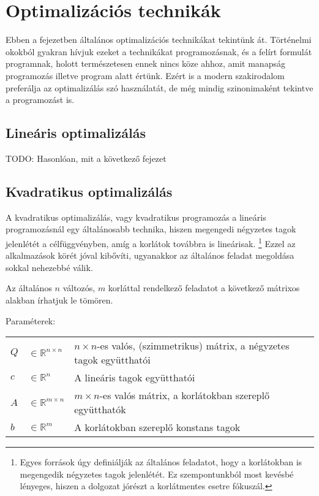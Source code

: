 
\chapter{Optimalizációs technikák}
Ebben a fejezetben általános optimalizációs technikákat tekintünk át. Történelmi okokból gyakran hívjuk ezeket a technikákat programozásnak, és a felírt formulát programnak, holott természetesen ennek nincs köze ahhoz, amit manapság programozás illetve program alatt értünk. Ezért is a modern szakirodalom preferálja az optimalizálás szó használatát, de még mindig szinonimaként tekintve a programozást is.



\section{Lineáris optimalizálás}

TODO: Hasonlóan, mit a következő fejezet

\section{Kvadratikus optimalizálás}

A kvadratikus optimalizálás, vagy kvadratikus programozás a lineáris programozásnál egy általánosabb technika, hiszen megengedi négyzetes tagok jelenlétét a célfüggvényben, amíg a korlátok továbbra is lineárisak. \footnote{Egyes források úgy definiálják az általános feladatot, hogy a korlátokban is megengedik négyzetes tagok jelenlétét. Ez szempontunkból most kevésbé lényeges, hiszen a dolgozat jórészt a korlátmentes esetre fókuszál.} Ezzel az alkalmazások körét jóval kibővíti, ugyanakkor az általános feladat megoldása sokkal nehezebbé válik. 

Az általános $n$ változós, $m$ korláttal rendelkező feladatot a következő mátrixos alakban írhatjuk le tömören.

Paraméterek:

\begin{tabular}{lll}
	$Q$ & $\in \mathbb{R}^{n×n}$  & $n × n$-es valós, (szimmetrikus) mátrix, a négyzetes tagok együtthatói \\
	$c$ & $\in \mathbb{R}^n$   & A lineáris tagok együtthatói \\
	$A$ & $\in \mathbb{R}^{m×n}$  & $m × n$-es valós mátrix, a korlátokban szereplő együtthatók \\
	$b$ & $\in \mathbb{R}^m$   & A korlátokban szereplő konstans tagok \\
\end{tabular}

